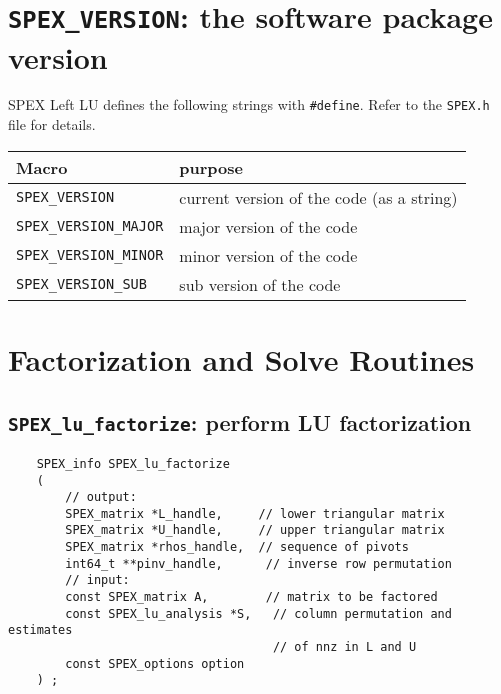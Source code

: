 \documentclass[12pt]{report}
\theoremstyle{definition}
\begin{document}
\cprotect\section{\verb|SPEX_VERSION|: the software package version}

SPEX Left LU defines the following strings with \verb|#define|. Refer to
the \verb|SPEX.h| file for details.

\begin{center}
\begin{tabular}{ll}
\hline
Macro & purpose \\
\hline
\verb|SPEX_VERSION|       & current version of the code (as a string)\\
\verb|SPEX_VERSION_MAJOR| & major version of the code\\
\verb|SPEX_VERSION_MINOR| & minor version of the code   \\
\verb|SPEX_VERSION_SUB|   & sub version of the code\\
\hline
\end{tabular}
\end{center}

\section{Factorization and Solve Routines}

\cprotect\subsection{\verb|SPEX_lu_factorize|: perform LU factorization}
\label{s:LeftLU:SPEX_lu_factorize}

\begin{mdframed}[userdefinedwidth=6in]
{\footnotesize
\begin{verbatim}
    SPEX_info SPEX_lu_factorize
    (
        // output:
        SPEX_matrix *L_handle,     // lower triangular matrix
        SPEX_matrix *U_handle,     // upper triangular matrix
        SPEX_matrix *rhos_handle,  // sequence of pivots
        int64_t **pinv_handle,      // inverse row permutation
        // input:
        const SPEX_matrix A,        // matrix to be factored
        const SPEX_lu_analysis *S,   // column permutation and estimates
                                     // of nnz in L and U 
        const SPEX_options option
    ) ;
\end{verbatim}
} \end{mdframed}
\end{document}
